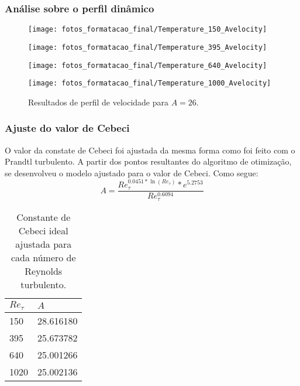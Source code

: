 \documentclass[xcolor=dvipsnames,10pt,aspectratio=169]{beamer}
\begin{document}
    \begin{frame}
		\frametitle{Análise sobre o perfil dinâmico}
      \begin{figure}[!h]
        \centering
        \begin{minipage}[t]{0.5\textwidth}
          \centering
          \texttt{[image: fotos\_formatacao\_final/Temperature\_150\_Avelocity]}
          \caption{$Re_\tau = 150$, $L2_d = 0.47$}
        \end{minipage}
        \begin{minipage}[t]{0.45\textwidth}
          \centering
          \texttt{[image: fotos\_formatacao\_final/Temperature\_395\_Avelocity]}
          \caption{$Re_\tau = 395$, $L2_d = 0.17$}
        \end{minipage}
        \begin{minipage}[t]{0.5\textwidth}
          \centering
          \texttt{[image: fotos\_formatacao\_final/Temperature\_640\_Avelocity]}
          \caption{$Re_\tau = 640$, $L2_d = 0.23$}
        \end{minipage}
        \begin{minipage}[t]{0.45\textwidth}
          \centering
          \texttt{[image: fotos\_formatacao\_final/Temperature\_1000\_Avelocity]}
          \caption{$Re_\tau = 1020$, $L2_d = 0.23$}
        \end{minipage}	
        \caption{Resultados de perfil de velocidade para $A = 26$.}
        \label{figura_10}
      \end{figure}
		\end{frame}	
		
		
	
	
		\begin{frame}
		\frametitle{Ajuste do valor de Cebeci}
		\begin{minipage}[h!]{0.45\textwidth}
      O valor da constate de Cebeci foi ajustada da mesma forma como foi feito com o Prandtl turbulento.
			A partir dos pontos resultantes do algoritmo de otimização, se desenvolveu o modelo ajustado para o valor de Cebeci. Como segue:
			\begin{equation}
			A = \frac{Re_\tau ^{0.0451 * \ln(Re_\tau)} *e ^ {5.2753} }{Re_\tau ^{0.6094}}
			\end{equation}
		\end{minipage}\hfill
		\begin{minipage}[h!]{0.45\textwidth}
    \begin{table}[!h]
	\centering
	\caption{Constante de Cebeci ideal ajustada para cada número de Reynolds turbulento.}
	\begin{tabular}{ll}
		\hline
		$Re_\tau$ & $A$\\
		\hline
		150  &   28.616180\\
		395  &   25.673782\\
		640  &   25.001266\\
		1020 &   25.002136\\ 
		\hline
	\end{tabular}
	\label{tablea}
\end{table}


		\end{minipage}
		\end{frame}	
\end{document}
